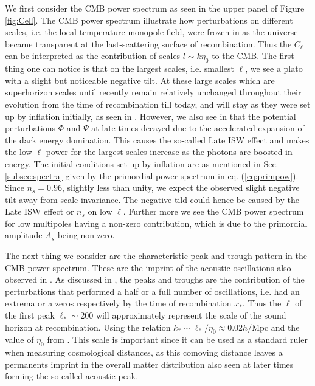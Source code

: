 \documentclass[twocolumn]{aastex62}
\begin{document}
We first consider the CMB power spectrum as seen in the upper panel of Figure \ref{fig:Cell}. The CMB power spectrum illustrate how perturbations on different scales, i.e. the local temperature monopole field, were frozen in as the universe became transparent at the last-scattering surface of recombination. Thus the $C_\ell$ can be interpreted as the contribution of scales $l\sim k\eta_0$ to the CMB. The first thing one can notice is that on the largest scales, i.e. smallest $\ell$, we see a plato with a slight but noticeable negative tilt. At these large scales which are superhorizon scales until recently remain relatively unchanged throughout their evolution from the time of recombination till today, and will stay as they were set up by inflation initially, as seen in \cite{stutzer:2020c}. However, we also see in \cite{stutzer:2020c} that the potential perturbations $\Phi$ and $\Psi$ at late times decayed due to the accelerated expansion of the dark energy domination. This causes the so-called Late ISW effect and makes the low $\ell$ power for the largest scales increase as the photons are boosted in energy. The initial conditions set up by inflation are as mentioned in Sec. \ref{subsec:spectra} given by the primordial power spectrum in eq. (\ref{eq:primpow}). Since $n_s =0.96$, slightly less than unity, we expect the observed slight negative tilt away from scale invariance. The negative tild could hence be caused by the Late ISW effect or $n_s$ on low $\ell$. Further more we see the CMB power spectrum for low multipoles having a non-zero contribution, which is due to the primordial amplitude $A_s$ being non-zero.

The next thing we consider are the characteristic peak and trough pattern in the CMB power spectrum. These are the imprint of the acoustic oscillations also observed in \cite{stutzer:2020c}. As discussed in \cite{stutzer:2020c}, the peaks and troughs are the contribution of the perturbations that performed a half or a full number of oscillations, i.e. had an extrema or a zeros respectively by the time of recombination $x_*$. Thus the $\ell$ of the first peak $\ell_*\sim 200$ will approximately represent the scale of the sound horizon at recombination. Using the relation $k_* \sim \ell_* / \eta_0 \approx 0.02 h/\mathrm{Mpc}$ and the value of $\eta_0$ from \cite{stutzer:2020a}. This scale is important since it can be used as a standard ruler when measuring cosmological distances, as this comoving distance leaves a permanents imprint in the overall matter distribution also seen at later times forming the so-called acoustic peak. 
\end{document}
